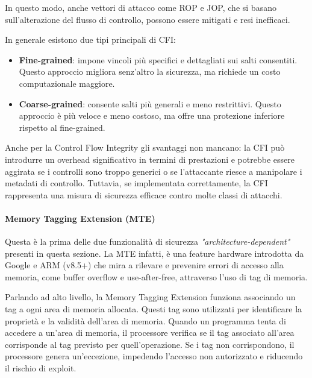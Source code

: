 In questo modo, anche vettori di attacco come ROP e JOP, che si basano sull'alterazione
del flusso di controllo, possono essere mitigati e resi inefficaci.

In generale esistono due tipi principali di CFI:
\begin{itemize}
  \item \textbf{Fine-grained}: impone vincoli più specifici e dettagliati sui salti
    consentiti. Questo approccio migliora senz'altro la sicurezza, ma richiede un
    costo computazionale maggiore.

  \item \textbf{Coarse-grained}: consente salti più generali e meno restrittivi.
    Questo approccio è più veloce e meno costoso, ma offre una protezione inferiore
    rispetto al fine-grained.
\end{itemize}

Anche per la Control Flow Integrity gli svantaggi non mancano: la CFI può
introdurre un overhead significativo in termini di prestazioni e potrebbe essere
aggirata se i controlli sono troppo generici o se l'attaccante riesce a
manipolare i metadati di controllo. Tuttavia, se implementata correttamente, la CFI
rappresenta una misura di sicurezza efficace contro molte classi di attacchi.

\paragraph{Memory Tagging Extension (MTE)}
Questa è la prima delle due funzionalità di sicurezza \textit{"architecture-dependent"}
presenti in questa sezione. La MTE infatti, è una feature hardware introdotta da
Google e ARM (v8.5+) che mira a rilevare e prevenire errori di accesso alla memoria,
come buffer overflow e use-after-free, attraverso l'uso di tag di memoria.

Parlando ad alto livello, la Memory Tagging Extension funziona associando un tag
a ogni area di memoria allocata. Questi tag sono utilizzati per identificare la proprietà
e la validità dell'area di memoria. Quando un programma tenta di accedere a un'area
di memoria, il processore verifica se il tag associato all'area corrisponde al tag
previsto per quell'operazione. Se i tag non corrispondono, il processore genera un'eccezione,
impedendo l'accesso non autorizzato e riducendo il rischio di exploit.

